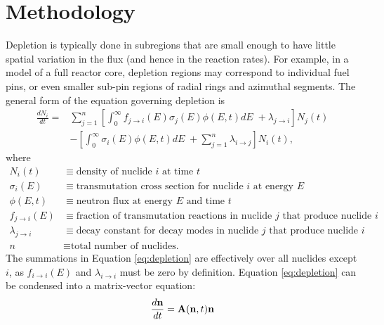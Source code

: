 \section{Methodology}
    \label{sec:methods}
    Depletion is typically done in subregions that are small enough to have
    little spatial variation in the flux (and hence in the reaction rates). For
    example, in a model of a full reactor core, depletion regions may correspond to
    individual fuel pins, or even smaller sub-pin regions of radial rings and
    azimuthal segments. The general form of the equation governing depletion is
    \begin{equation}
      \label{eq:depletion}
      \begin{split}
        \frac{dN_i}{dt} = &\sum\limits_{j=1}^n \left[ \int_0^\infty 
        f_{j \rightarrow i}(E) \sigma_j (E) \phi(E,t) dE \;+ \lambda_{j\rightarrow i}
        \right] N_j(t) \\ &- \left [\int_0^\infty \sigma_i (E) \phi(E,t) dE \; +
        \sum\limits_{j=1}^n \lambda_{i\rightarrow j} \right ] N_i(t),
      \end{split}
    \end{equation}
    where
    \begin{equation*}
      \begin{split}
        N_i(t) &\equiv \text{density of nuclide $i$ at time $t$} \\
        \sigma_i(E) &\equiv \text{transmutation cross section for nuclide $i$ at energy $E$} \\
        \phi(E,t) &\equiv \text{neutron flux at energy $E$ and time $t$} \\
        f_{j \rightarrow i}(E) &\equiv \text{fraction of transmutation reactions in nuclide $j$ that produce nuclide $i$} \\
        \lambda_{j \rightarrow i} &\equiv \text{decay constant for decay modes in nuclide $j$ that produce nuclide $i$} \\
        n &\equiv \text{total number of nuclides.}
      \end{split}
    \end{equation*}
    The summations in Equation \ref{eq:depletion} are effectively over all
    nuclides except $i$, as $f_{i \rightarrow i}(E)$ and $\lambda_{i \rightarrow i}$ must
    be zero by definition. Equation \ref{eq:depletion} can be condensed into a
    matrix-vector equation:
    \begin{equation}
      \label{eq:depletion-matrix-t}
      \frac{d\mathbf{n}}{dt} = \mathbf{A}(\mathbf{n},t)\mathbf{n}
    \end{equation}
